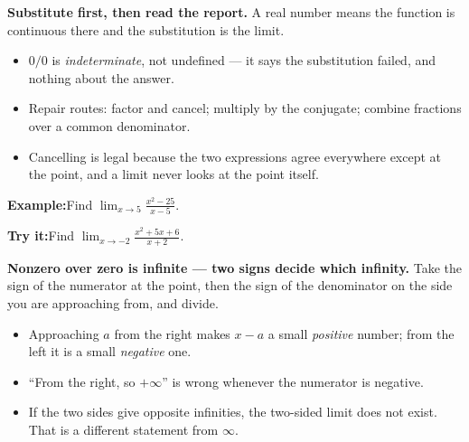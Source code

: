 \documentclass[12pt]{article}
\begin{document}


\begin{formulabox}
\textbf{Substitute first, then read the report.} A real number means the function is continuous there and the substitution is the limit.
\begin{itemize}[leftmargin=0.8cm, itemsep=0pt, topsep=1pt]
  \item $0/0$ is \emph{indeterminate}, not undefined --- it says the substitution failed, and nothing about the answer.
  \item Repair routes: factor and cancel; multiply by the conjugate; combine fractions over a common denominator.
  \item Cancelling is legal because the two expressions agree everywhere except at the point, and a limit never looks at the point itself.
\end{itemize}
\end{formulabox}

\begin{examplebox}
\textbf{Example:}\quad Find $\displaystyle\lim_{x \to 5} \frac{x^2 - 25}{x - 5}$.
\end{examplebox}

\begin{tryitbox}
\textbf{Try it:}\quad Find $\displaystyle\lim_{x \to -2} \frac{x^2 + 5x + 6}{x + 2}$.\\[2pt]
\end{tryitbox}


\begin{formulabox}
\textbf{Nonzero over zero is infinite --- two signs decide which infinity.} Take the sign of the numerator at the point, then the sign of the denominator on the side you are approaching from, and divide.
\begin{itemize}[leftmargin=0.8cm, itemsep=0pt, topsep=1pt]
  \item Approaching $a$ from the right makes $x - a$ a small \emph{positive} number; from the left it is a small \emph{negative} one.
  \item ``From the right, so $+\infty$'' is wrong whenever the numerator is negative.
  \item If the two sides give opposite infinities, the two-sided limit does not exist. That is a different statement from $\infty$.
\end{itemize}
\end{formulabox}
\end{document}
